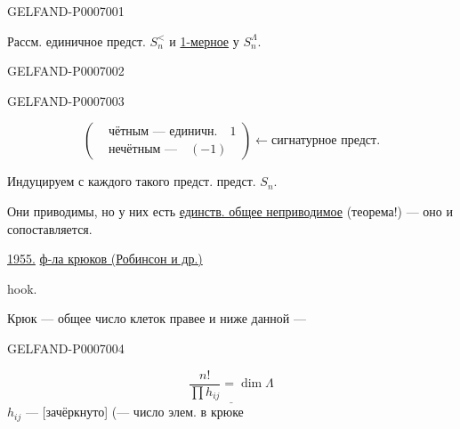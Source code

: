 \begin{GelfandAdjacentEvidence}{GELFAND-P000700}{1}

Рассм. единичное предст. \(S_n^{<}\) и \underline{1-мерное} у \(S_n^\Lambda\).
\end{GelfandAdjacentEvidence}
\begin{GelfandAdjacentEvidence}{GELFAND-P000700}{2}

\end{GelfandAdjacentEvidence}
\begin{GelfandAdjacentEvidence}{GELFAND-P000700}{3}


\[
\left(\begin{aligned}
&\text{чётным --- единичн.}\quad 1\\
&\text{нечётным ---}\quad (-1)
\end{aligned}\right)\longleftarrow\text{сигнатурное предст.}
\]

Индуцируем с каждого такого предст. предст. \(S_n\).

Они приводимы, но у них есть \underline{единств. общее неприводимое} (теорема!) --- оно и сопоставляется.

\underline{1955.} \href{https://doi.org/10.4153/CJM-1954-030-1}{ф-ла крюков (Робинсон и др.)}

hook.

Крюк --- общее число клеток правее и ниже данной ---

\end{GelfandAdjacentEvidence}
\begin{GelfandAdjacentEvidence}{GELFAND-P000700}{4}


\[
\underline{\frac{n!}{\prod h_{ij}}=\dim\Lambda}
\]
\(h_{ij}\) --- [зачёркнуто] (--- число элем. в крюке
\end{GelfandAdjacentEvidence}
